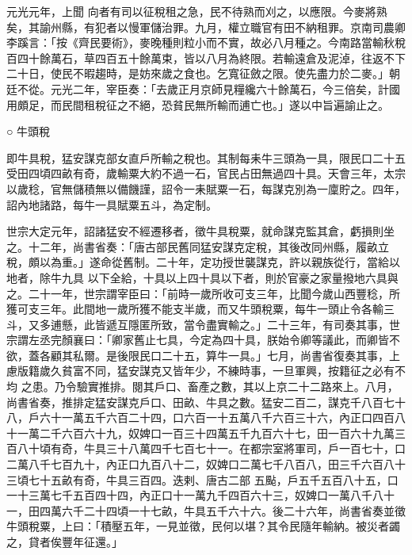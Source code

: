 \begin{pinyinscope}
 元光元年，上聞
 向者有司以征稅租之急，民不待熟而刈之，以應限。今麥將熟矣，其諭州縣，有犯者以慢軍儲治罪。九月，權立職官有田不納租罪。京南司農卿李蹊言：「按《齊民要術》，麥晚種則粒小而不實，故必八月種之。今南路當輸秋稅百四十餘萬石，草四百五十餘萬束，皆以八月為終限。若輸遠倉及泥淖，往返不下二十日，使民不暇趨時，是妨來歲之食也。乞寬征斂之限。使先盡力於二麥。」朝廷不從。元光二年，宰臣奏：「去歲正月京師見糧纔六十餘萬石，今三倍矣，計國用頗足，而民間租稅征之不絕，恐貧民無所輸而逋亡也。」遂以中旨遍諭止之。



 ○
 牛頭稅



 即牛具稅，猛安謀克部女直戶所輸之稅也。其制每耒牛三頭為一具，限民口二十五受田四頃四畝有奇，歲輸粟大約不過一石，官民占田無過四十具。天會三年，太宗以歲稔，官無儲積無以備饑謹，詔令一耒賦粟一石，每謀克別為一廩貯之。四年，詔內地諸路，每牛一具賦粟五斗，為定制。



 世宗大定元年，詔諸猛安不經遷移者，徵牛具稅粟，就命謀克監其倉，虧損則坐之。十二年，尚書省奏：「唐古部民舊同猛安謀克定稅，其後改同州縣，履畝立稅，頗以為重。」遂命從舊制。二十年，定功授世襲謀克，許以親族從行，當給以地者，除牛九具
 以下全給，十具以上四十具以下者，則於官豪之家量撥地六具與之。二十一年，世宗謂宰臣曰：「前時一歲所收可支三年，比聞今歲山西豐稔，所獲可支三年。此間地一歲所獲不能支半歲，而又牛頭稅粟，每牛一頭止令各輸三斗，又多逋懸，此皆遞互隱匿所致，當令盡實輸之。」二十三年，有司奏其事，世宗謂左丞完顏襄曰：「卿家舊止七具，今定為四十具，朕始令卿等議此，而卿皆不欲，蓋各顧其私爾。是後限民口二十五，算牛一具。」七月，尚書省復奏其事，上慮版籍歲久貧富不同，猛安謀克又皆年少，不練時事，一旦軍興，按籍征之必有不均
 之患。乃令驗實推排。閱其戶口、畜產之數，其以上京二十二路來上。八月，尚書省奏，推排定猛安謀克戶口、田畝、牛具之數。猛安二百二，謀克千八百七十八，戶六十一萬五千六百二十四，口六百一十五萬八千六百三十六，內正口四百八十一萬二千六百六十九，奴婢口一百三十四萬五千九百六十七，田一百六十九萬三百八十頃有奇，牛具三十八萬四千七百七十一。在都宗室將軍司，戶一百七十，口二萬八千七百九十，內正口九百八十二，奴婢口二萬七千八百八，田三千六百八十三頃七十五畝有奇，牛具三百四。迭剌、唐古二部
 五颭，戶五千五百八十五，口一十三萬七千五百四十四，內正口十一萬九千四百六十三，奴婢口一萬八千八十一，田四萬六千二十四頃一十七畝，牛具五千六十六。後二十六年，尚書省奏並徵牛頭稅粟，上曰：「積壓五年，一見並徵，民何以堪？其令民隨年輸納。被災者蠲之，貸者俟豐年征還。」



\end{pinyinscope}